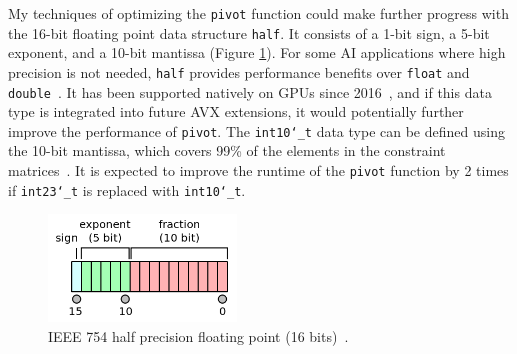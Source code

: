 \documentclass[logo,bsc,singlespacing,parskip]{infthesis}
\newcommand{\dthalfi}{\texttt{int10\char`_t}}
\newcommand{\dthalf}{\texttt{half}}
\newcommand{\dtfloat}{\texttt{float}}
\newcommand{\dtfloati}{\texttt{int23\char`_t}}
\newcommand{\dtdouble}{\texttt{double}}
\newcommand{\pivot}{\texttt{pivot}}
\begin{document}
My techniques of optimizing the \texttt{pivot} function could make further
progress with the 16-bit floating point data structure \dthalf{}. It consists of
a 1-bit sign, a 5-bit exponent, and a 10-bit mantissa (Figure
\ref{fig:ieee-f16}). For some AI applications where high precision is not
needed, \dthalf{} provides performance benefits over \dtfloat{} and
\dtdouble{}~\cite{fp16-fast}. It has been supported natively on GPUs since
2016~\cite{pascal-intro-fp16}, and if this data type is integrated into future
AVX extensions, it would potentially further improve the performance of
\pivot{}. The \dthalfi{} data type can be defined using the 10-bit
mantissa, which covers 99\% of the elements in the constraint
matrices~\cite{FPL1}. It is expected to improve the runtime of the \pivot{}
function by 2 times if \dtfloati{} is replaced with \dthalfi{}.


\begin{figure}[H]
    \begin{center}
    \includegraphics[width=50mm,scale=0.1]{image/ieee-f16.png}
    \end{center}
    \caption{IEEE 754 half precision floating point (16 bits)~\cite{fp16-diagram}.}
    \label{fig:ieee-f16}
\end{figure}




\end{document}
